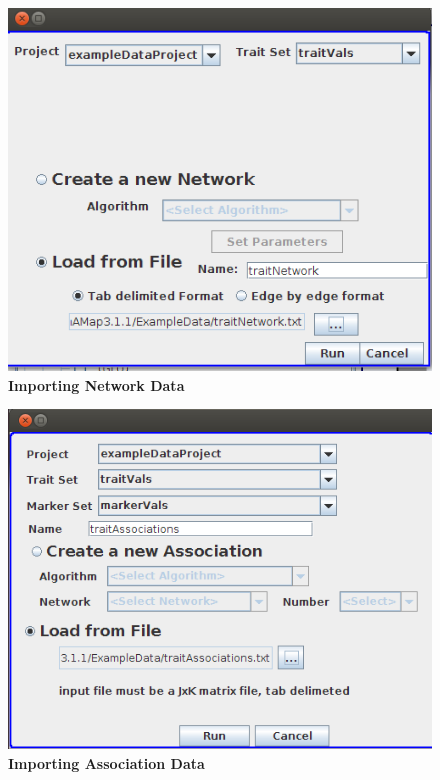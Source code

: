 \documentclass{article}
\begin{document}
\begin{figure}
\includegraphics[width=\textwidth]{Figure3.png}
\caption{\textbf{Importing Network Data}}
\end{figure}

\begin{figure}
\includegraphics[width=\textwidth]{Figure4.png}
\caption{\textbf{Importing Association Data}}
\end{figure}
\end{document}
